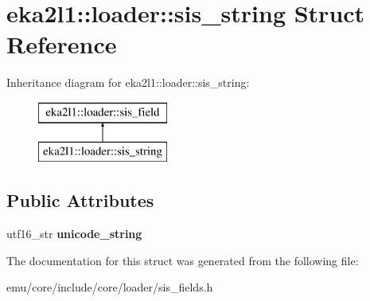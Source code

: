 \hypertarget{structeka2l1_1_1loader_1_1sis__string}{}\section{eka2l1\+:\+:loader\+:\+:sis\+\_\+string Struct Reference}
\label{structeka2l1_1_1loader_1_1sis__string}
Inheritance diagram for eka2l1\+:\+:loader\+:\+:sis\+\_\+string\+:\begin{figure}[H]
\begin{center}
\leavevmode
\includegraphics[height=2.000000cm]{structeka2l1_1_1loader_1_1sis__string}
\end{center}
\end{figure}
\subsection*{Public Attributes}
\begin{DoxyCompactItemize}
\item 
\mbox{\label{structeka2l1_1_1loader_1_1sis__string_a1b908e5893a31cd849bcb80a034c196a}} 
utf16\+\_\+str {\bfseries unicode\+\_\+string}
\end{DoxyCompactItemize}


The documentation for this struct was generated from the following file\+:\begin{DoxyCompactItemize}
\item 
emu/core/include/core/loader/sis\+\_\+fields.\+h\end{DoxyCompactItemize}
